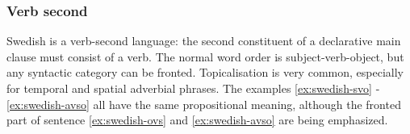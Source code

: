 \documentclass{report}
\begin{document}
\subsubsection*{Verb second}
Swedish is a verb-second language\cite[p. 116]{gunlog}: the
second constituent of a declarative main clause must consist of a verb.
The normal word order is subject-verb-object, but any syntactic category can be
fronted\cite[]{H&H}.
Topicalisation is very common, especially for temporal and spatial adverbial phrases.
The examples \ref{ex:swedish-svo} - \ref{ex:swedish-avso} all have the same propositional
meaning, although the fronted part of sentence \ref{ex:swedish-ovs} and \ref{ex:swedish-avso} are being emphasized.
 \label{ex:swedish-svo}
\vspace{-3mm}
\label{ex:swedish-ovs} 
\vspace{-3mm}
 \label{ex:swedish-avso}

\end{document}
